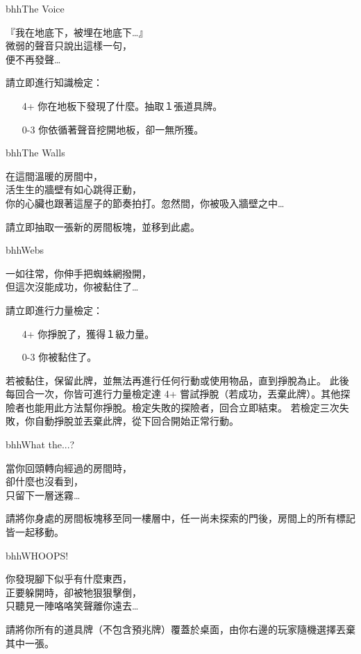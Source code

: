 \linebreak[0]%
\begin{EventCard}{bhh}{The Voice}
	\begin{CardStory}
		『我在地底下，被埋在地底下…』\\
		微弱的聲音只說出這樣一句，\\
		便不再發聲…
	\end{CardStory}
	請立即進行知識檢定：
	\begin{itemize}
		\item[4+] 你在地板下發現了什麼。抽取１張道具牌。
		\item[0-3] 你依循著聲音挖開地板，卻一無所獲。
	\end{itemize}
\end{EventCard}%
\linebreak[0]%
\begin{EventCard}{bhh}{The Walls}
	\begin{CardStory}
		在這間溫暖的房間中，\\
		活生生的牆壁有如心跳得正動，\\
		你的心臟也跟著這屋子的節奏拍打。忽然間，你被吸入牆壁之中…
	\end{CardStory}
	請立即抽取一張新的房間板塊，並移到此處。\smallbreak
\end{EventCard}%
\linebreak[0]%
\begin{EventCard}{bhh}{Webs}
	\begin{CardStory}
		一如往常，你伸手把蜘蛛網撥開，\\
		但這次沒能成功，你被黏住了…
	\end{CardStory}
	請立即進行力量檢定：
	\begin{itemize}
		\item[4+] 你掙脫了，獲得１級力量。
		\item[0-3] 你被黏住了。
	\end{itemize}
	若被黏住，保留此牌，並無法再進行任何行動或使用物品，直到掙脫為止。\smallbreak
	此後每回合一次，你皆可進行力量檢定達 4+ 嘗試掙脫（若成功，丟棄此牌）。其他探險者也能用此方法幫你掙脫。檢定失敗的探險者，回合立即結束。\smallbreak
	若檢定三次失敗，你自動掙脫並丟棄此牌，從下回合開始正常行動。\smallbreak
\end{EventCard}%
\linebreak[0]%
\begin{EventCard}{bhh}{What the...?}
	\begin{CardStory}
		當你回頭轉向經過的房間時，\\
		卻什麼也沒看到，\\
		只留下一層迷霧…
	\end{CardStory}
	請將你身處的房間板塊移至同一樓層中，任一尚未探索的門後，房間上的所有標記皆一起移動。\smallbreak
\end{EventCard}%
\linebreak[0]%
\begin{EventCard}{bhh}{WHOOPS!}
	\begin{CardStory}
		你發現腳下似乎有什麼東西，\\
		正要躲開時，卻被牠狠狠擊倒，\\
		只聽見一陣咯咯笑聲離你遠去…
	\end{CardStory}
	請將你所有的道具牌（不包含預兆牌）覆蓋於桌面，由你右邊的玩家隨機選擇丟棄其中一張。\smallbreak
\end{EventCard}%
\linebreak[0]%
